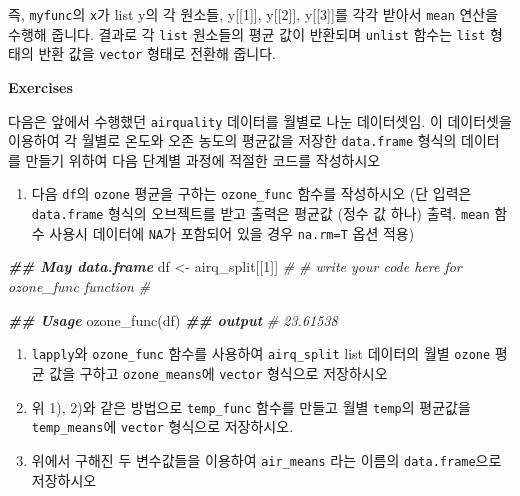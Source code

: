 \documentclass[
]{book}
\newenvironment{Shaded}{\begin{snugshade}}{\end{snugshade}}
\newcommand{\CommentTok}[1]{\textcolor[rgb]{0.56,0.35,0.01}{\textit{#1}}}
\newcommand{\DecValTok}[1]{\textcolor[rgb]{0.00,0.00,0.81}{#1}}
\newcommand{\DocumentationTok}[1]{\textcolor[rgb]{0.56,0.35,0.01}{\textbf{\textit{#1}}}}
\newcommand{\FunctionTok}[1]{\textcolor[rgb]{0.00,0.00,0.00}{#1}}
\newcommand{\NormalTok}[1]{#1}
\newcommand{\OtherTok}[1]{\textcolor[rgb]{0.56,0.35,0.01}{#1}}
\newcommand{\SpecialCharTok}[1]{\textcolor[rgb]{0.00,0.00,0.00}{#1}}
\providecommand{\tightlist}{%
  \setlength{\itemsep}{0pt}\setlength{\parskip}{0pt}}
\begin{document}
즉, \texttt{myfunc}의 \texttt{x}가 list y의 각 원소들, y{[}{[}1{]}{]}, y{[}{[}2{]}{]}, y{[}{[}3{]}{]}를 각각 받아서 \texttt{mean} 연산을 수행해 줍니다. 결과로 각 \texttt{list} 원소들의 평균 값이 반환되며 \texttt{unlist} 함수는 \texttt{list} 형태의 반환 값을 \texttt{vector} 형태로 전환해 줍니다.

\textbf{Exercises}

다음은 앞에서 수행했던 \texttt{airquality} 데이터를 월별로 나눈 데이터셋임. 이 데이터셋을 이용하여 각 월별로 온도와 오존 농도의 평균값을 저장한 \texttt{data.frame} 형식의 데이터를 만들기 위하여 다음 단계별 과정에 적절한 코드를 작성하시오

\begin{Shaded}
\end{Shaded}

\begin{enumerate}
\def\labelenumi{\arabic{enumi})}
\tightlist
\item
  다음 \texttt{df}의 \texttt{ozone} 평균을 구하는 \texttt{ozone\_func} 함수를 작성하시오 (단 입력은 \texttt{data.frame} 형식의 오브젝트를 받고 출력은 평균값 (정수 값 하나) 출력. \texttt{mean} 함수 사용시 데이터에 \texttt{NA}가 포함되어 있을 경우 \texttt{na.rm=T} 옵션 적용)
\end{enumerate}

\begin{Shaded}
\begin{Highlighting}[]
\DocumentationTok{\#\# May data.frame}
\NormalTok{df }\OtherTok{\textless{}{-}}\NormalTok{ airq\_split[[}\DecValTok{1}\NormalTok{]]}
\CommentTok{\#}
\CommentTok{\# write your code here for ozone\_func function}
\CommentTok{\#}

\DocumentationTok{\#\# Usage}
\FunctionTok{ozone\_func}\NormalTok{(df)}
\DocumentationTok{\#\# output}
\CommentTok{\# 23.61538}
\end{Highlighting}
\end{Shaded}

\begin{enumerate}
\def\labelenumi{\arabic{enumi})}
\setcounter{enumi}{1}
\item
  \texttt{lapply}와 \texttt{ozone\_func} 함수를 사용하여 \texttt{airq\_split} list 데이터의 월별 \texttt{ozone} 평균 값을 구하고 \texttt{ozone\_means}에 \texttt{vector} 형식으로 저장하시오
\item
  위 1), 2)와 같은 방법으로 \texttt{temp\_func} 함수를 만들고 월별 \texttt{temp}의 평균값을 \texttt{temp\_means}에 \texttt{vector} 형식으로 저장하시오.
\item
  위에서 구해진 두 변수값들을 이용하여 \texttt{air\_means} 라는 이름의 \texttt{data.frame}으로 저장하시오
\end{enumerate}
\end{document}
